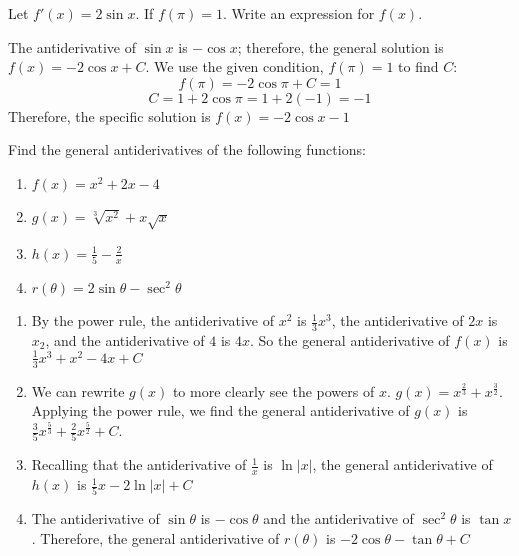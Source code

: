 \begin{Exercise}[label=antideriv2]
	Let $f'(x) = 2\sin{x}$. If $f(\pi) = 1$. Write an expression for 
	$f(x)$. 
\end{Exercise}

\begin{Answer}[ref=antideriv2]
	The antiderivative of $\sin{x}$ is $-\cos{x}$; therefore, the 
	general solution is $f(x) = -2\cos{x} + C$. We use the given 
	condition, $f(\pi) = 1$ to find $C$:
	$$f(\pi) = -2\cos{\pi} + C = 1$$
	$$C = 1 + 2\cos{\pi} = 1 + 2(-1) = -1$$
	Therefore, the specific solution is $f(x) = -2\cos{x} - 1$
\end{Answer}

\begin{Exercise}[label=antideriv3]
	Find the general antiderivatives of the following functions:
	\begin{enumerate}
	\item $f(x) = x^2 + 2x - 4$
	\item $g(x) = \sqrt[3]{x^2} + x\sqrt{x}$
	\item $h(x) = \frac{1}{5} - \frac{2}{x}$
	\item $r(\theta) = 2\sin{\theta} - \sec^2{\theta}$
	\end{enumerate} 	
\end{Exercise}

\begin{Answer}[ref=antideriv3]
	\begin{enumerate}
	\item By the power rule, the antiderivative of $x^2$ is 
	$\frac{1}{3}x^3$, the antiderivative of $2x$ is $x_2$, and the 
	antiderivative of $4$ is $4x$. So the general antiderivative of $f(x)$ 
	is $\frac{1}{3}x^3 + x^2 - 4x + C$
	\item We can rewrite $g(x)$ to more clearly see the powers of $x$. 
	$g(x) = x^{\frac{2}{3}} + x^{\frac{3}{2}}$. Applying the power rule, 
	we find the general antiderivative of $g(x)$ is 
	$\frac{3}{5}x^{\frac{5}{3}} + \frac{2}{5}x^{\frac{5}{2}} + C$. 
	\item Recalling that the antiderivative of $\frac{1}{x}$ is 
	$\ln{|x|}$, the general antiderivative of $h(x)$ is $\frac{1}{5}x - 
	2\ln{|x|} + C$
	\item The antiderivative of $\sin{\theta}$ is $-\cos{\theta}$ and the 
	antiderivative of $\sec^2{\theta}$ is $\tan{x}$. Therefore, the 
	general antiderivative of $r(\theta)$ is $-2\cos{\theta} - 
	\tan{\theta} + C$
	\end{enumerate}
\end{Answer}


